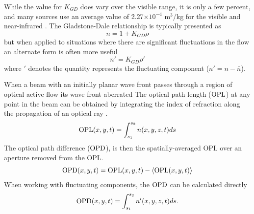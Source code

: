 While the value for $K_{GD}$ does vary over the visible range, it is only a few percent, and many sources use an average value of 2.27$\times10^{-4}$ m$^3$/kg for the visible and near-infrared \cite{Gardiner-1980-reW8xrCb}.
The Gladstone-Dale relationship is typically presented as
\begin{equation}
  n = 1+K_{GD}\rho
  \label{eqn:02_gladstone_dale_relation}
\end{equation}
but when applied to situations where there are significant fluctuations in the flow an alternate form is often more useful
\begin{equation}
  n'=K_{GD}\rho'
  \label{eqn:02_gladstone_dale_relation_fluctuating}
\end{equation}
where $'$ denotes the quantity represents the fluctuating component ($n' = n-\bar{n}$).

When a beam with an initially planar wave front passes through a region of optical active flow its wave front aberrated
The optical path length ($\operatorname{OPL}$) at any point in the beam can be obtained by integrating the index of refraction along the propagation of an optical ray \cite{Klein-1986-8Vx29RfE}.
\begin{equation}
  \operatorname{OPL} (x,y,t) = \int^{s_2}_{s_1} n(x,y,z,t)ds
  \label{eqn:02_opl}
\end{equation}
The optical path difference ($\operatorname{OPD}$), is then the spatially-averaged $\textrm{OPL}$ over an aperture removed from the OPL.
\begin{equation}
  \operatorname{OPD}(x,y,t) = \operatorname{OPL}(x,y,t)-\langle\operatorname{OPL}(x,y,t)\rangle
  \label{eqn:02_opd}
\end{equation}
When working with fluctuating components, the $\operatorname{OPD}$ can be calculated directly
\begin{equation}
  \operatorname{OPD}(x,y,t) = \int^{s_2}_{s_1} n'(x,y,z,t)ds \textrm{.}
  \label{eqn:02_opd_n}
\end{equation}

